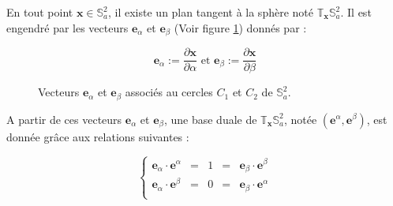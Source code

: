 En tout point $\mathbf{x} \in \mathbb{S}_a^2$, il existe un plan tangent à la sphère noté $\mathbb{T}_{\mathbf{x}}\mathbb{S}_a^2$. Il est engendré par les vecteurs $\mathbf{e}_{\alpha}$ et $\mathbf{e}_{\beta}$ (Voir figure \ref{fig: e_alpha et e_beta}) donnés par :

\begin{equation}
\mathbf{e}_{\alpha} := \dfrac{\partial \mathbf{x}}{\partial \alpha} \text{ et } \mathbf{e}_{\beta} := \dfrac{\partial \mathbf{x}}{\partial \beta}
\end{equation}

\begin{figure}[ht]
\begin{center}
\end{center}
\caption{Vecteurs $\mathbf{e}_{\alpha}$ et $\mathbf{e}_{\beta}$ associés au cercles $C_1$ et $C_2$ de $\mathbb{S}_a^2$.}
\label{fig: e_alpha et e_beta}
\end{figure}

A partir de ces vecteurs $\mathbf{e}_{\alpha}$ et $\mathbf{e}_{\beta}$, une base duale de $\mathbb{T}_{\mathbf{x}}\mathbb{S}_a^2$, notée $\left( \mathbf{e}^{\alpha}, \mathbf{e}^{\beta} \right)$, est donnée grâce aux relations suivantes :

\begin{equation}
\left\lbrace
\begin{array}{rcccl}
\mathbf{e}_{\alpha} \cdot \mathbf{e}^{\alpha} & = & 1 & = & \mathbf{e}_{\beta} \cdot \mathbf{e}^{\beta} \\
\mathbf{e}_{\alpha} \cdot \mathbf{e}^{\beta} & = & 0 & = & \mathbf{e}_{\beta} \cdot \mathbf{e}^{\alpha} \\
\end{array}
\right.
\label{eq: dualite alpha beta}
\end{equation}

